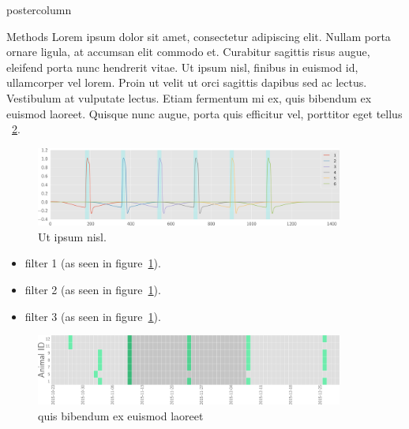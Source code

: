 \documentclass{beamer}
\begin{document}
\begin{frame}
\begin{columns}
\begin{column}{.43\textwidth}
\begin{beamercolorbox}[center]{postercolumn}
\begin{minipage}{.98\textwidth}
{					
					\begin{myblock}{Methods}
						Lorem ipsum dolor sit amet, consectetur adipiscing elit. Nullam porta ornare ligula, at accumsan elit commodo et. Curabitur sagittis risus augue, eleifend porta nunc hendrerit vitae. Ut ipsum nisl, finibus in euismod id, ullamcorper vel lorem. Proin ut velit ut orci sagittis dapibus sed ac lectus. Vestibulum at vulputate lectus. Etiam fermentum mi ex, quis bibendum ex euismod laoreet. Quisque nunc augue, porta quis efficitur vel, porttitor eget tellus ~\ref{fig:tt}.
						\vspace{0.5em}
						\begin{figure}
							\begin{minipage}{0.94\textwidth}
								\centering\includegraphics[width=0.9\textwidth]{img/dm.png}
								\caption{Ut ipsum nisl.}
								\label{fig:stim}
							\end{minipage}
						\end{figure}
						
						\begin{itemize}
						
							\item filter 1 (as seen in figure~\ref{fig:stim}).
							
						 	\item filter 2 (as seen in figure~\ref{fig:stim}).
						 	
						 	\item filter 3 (as seen in figure~\ref{fig:stim}).
						 	
						\end{itemize}
						\vspace{0.5em}
						\begin{figure}
							\begin{minipage}{0.94\textwidth}
								\centering\includegraphics[width=0.9\textwidth]{img/tt.png}
								\caption{quis bibendum ex euismod laoreet}
								\label{fig:tt}
							\end{minipage}
						\end{figure}
					\end{myblock}\vfill
		}\end{minipage}\end{beamercolorbox}
	\end{column}
	

\end{columns}
\end{frame}
\end{document}
